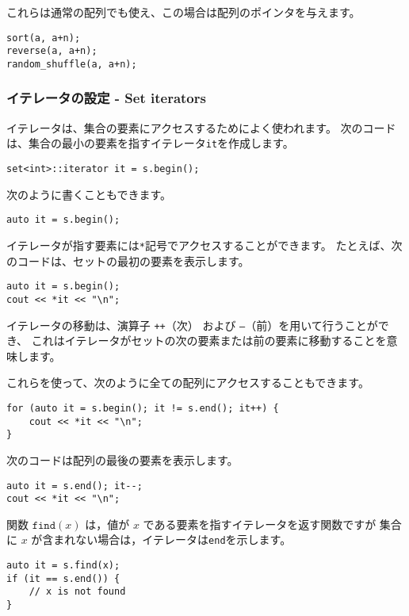 これらは通常の配列でも使え、この場合は配列のポインタを与えます。

\newpage
\begin{lstlisting}
sort(a, a+n);
reverse(a, a+n);
random_shuffle(a, a+n);
\end{lstlisting}

\subsubsection{イテレータの設定 - Set iterators}

イテレータは、集合の要素にアクセスするためによく使われます。
次のコードは、集合の最小の要素を指すイテレータ\texttt{it}を作成します。

\begin{lstlisting}
set<int>::iterator it = s.begin();
\end{lstlisting}

次のように書くこともできます。

\begin{lstlisting}
auto it = s.begin();
\end{lstlisting}

イテレータが指す要素には\texttt{*}記号でアクセスすることができます。
たとえば、次のコードは、セットの最初の要素を表示します。

\begin{lstlisting}
auto it = s.begin();
cout << *it << "\n";
\end{lstlisting}

イテレータの移動は、演算子 \texttt{++}（次）
および \texttt{--}（前）を用いて行うことができ、
これはイテレータがセットの次の要素または前の要素に移動することを意味します。

これらを使って、次のように全ての配列にアクセスすることもできます。
\begin{lstlisting}
for (auto it = s.begin(); it != s.end(); it++) {
    cout << *it << "\n";
}
\end{lstlisting}

次のコードは配列の最後の要素を表示します。

\begin{lstlisting}
auto it = s.end(); it--;
cout << *it << "\n";
\end{lstlisting}

関数 $\texttt{find}(x)$ は，値が $x$ である要素を指すイテレータを返す関数ですが
集合に $x$ が含まれない場合は，イテレータは\texttt{end}を示します。

\begin{lstlisting}
auto it = s.find(x);
if (it == s.end()) {
    // x is not found
}
\end{lstlisting}

